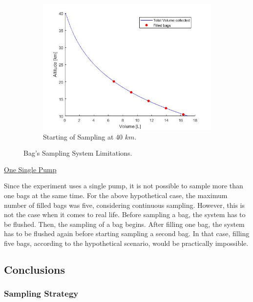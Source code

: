 \documentclass[a4paper,12pt,oneside]{article}
\begin{document}
\begin{appendices}
\begin{figure}[H]
\begin{subfigure}{0.45\textwidth}
    \centering\includegraphics[width=1.2\textwidth]{appendix/img/samplevolume40km.png}
    \caption{Starting of Sampling at 40 $km$.}
  \end{subfigure}
  \caption{Bag's Sampling System Limitations.}\label{fig:limits}
\end{figure}


\bigskip
\underline{One Single Pump}

\smallskip
Since the experiment uses a single pump, it is not possible to sample more than one bags at the same time. For the above hypothetical case, the maximum number of filled bags was five, considering continuous sampling. However, this is not the case when it comes to real life. Before sampling a bag, the system has to be flushed. Then, the sampling of a bag begins. After filling one bag, the system has to be flushed again before starting sampling a second bag. In that case, filling five bags, according to the hypothetical scenario, would be practically impossible.


\newpage
\subsection{Conclusions}

\subsubsection{Sampling Strategy}


\end{appendices}
\end{document}
